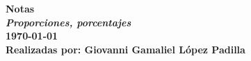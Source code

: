 \textbf{Notas\\
    \textit{Proporciones, porcentajes}}\\

\textbf{\today}
\\

\textbf{Realizadas por: Giovanni Gamaliel López Padilla}\\